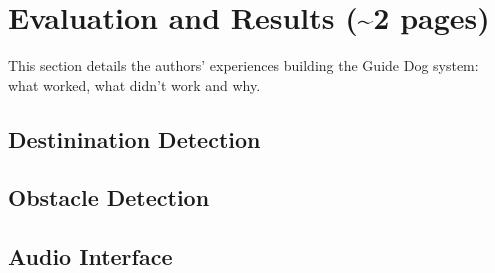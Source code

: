 \section{Evaluation and Results (\textasciitilde 2 pages)}
\label{sec:eval}

This section details the authors' experiences building the Guide Dog system:
what worked, what didn't work and why.

\subsection{Destinination Detection}
\label{sec:eval-dest}


\subsection{Obstacle Detection}
\label{sec:eval-obs}


\subsection{Audio Interface}
\label{sec:eval-audio}
